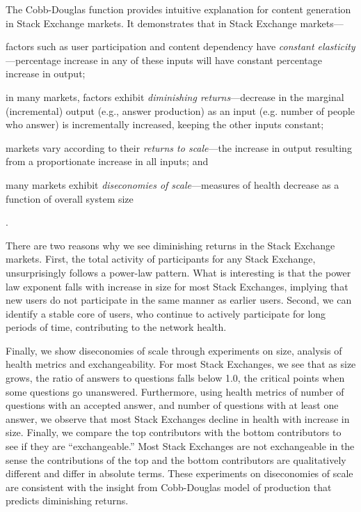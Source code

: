 The Cobb-Douglas function provides intuitive explanation for content generation in Stack Exchange markets. It demonstrates that in Stack Exchange markets--- \begin{enumerate*}
  \item factors such as user participation and content dependency have \emph{constant elasticity}---percentage increase in any of these inputs will have constant percentage increase in output;
  \item in many markets, factors exhibit \emph{diminishing returns}---decrease in the marginal (incremental) output (e.g., answer production) as an input (e.g. number of people who answer) is incrementally increased, keeping the other inputs constant;
  \item markets vary according to their \emph{returns to scale}---the increase in output resulting from a proportionate increase in all inputs; and
  \item many markets exhibit \emph{diseconomies of scale}---measures of
   health decrease as a function of overall
   system size
 \end{enumerate*}.
  

There are two reasons why we see diminishing returns in the Stack Exchange markets. First, the total activity of participants for any Stack Exchange, unsurprisingly follows a power-law pattern. What is interesting is that the power law exponent falls with increase in size for most Stack Exchanges, implying that new users do not participate in the same manner as earlier users. Second, we can identify a stable core of users, who continue to actively participate for long periods of time, contributing to the network health.

Finally, we show diseconomies of scale through experiments on size, analysis of health metrics and exchangeability. For most Stack Exchanges, we see that as size grows, the ratio of answers to questions falls below 1.0, the critical points when some questions go unanswered. Furthermore, using health metrics of number of questions with an accepted answer, and number of questions with at least one answer, we observe that most Stack Exchanges decline in health with increase in size. Finally, we compare the top contributors with the bottom contributors to see if they are ``exchangeable.'' Most Stack Exchanges are not exchangeable in the sense the contributions of the top and the bottom contributors are qualitatively different and differ in absolute terms. These experiments on diseconomies of scale are consistent with the insight from Cobb-Douglas model of production that predicts diminishing returns.

